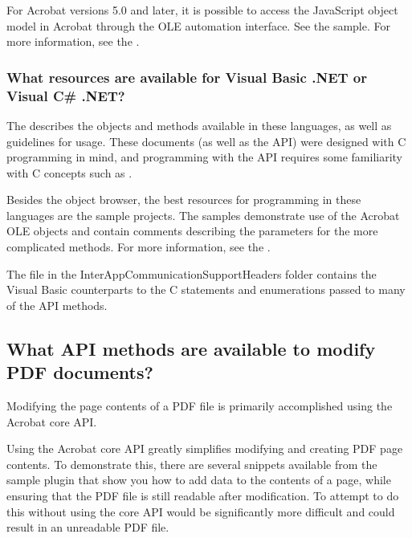 \documentclass[letterpaper,12pt,english,openany,oneside]{sphinxmanual}
\begin{document}
For Acrobat versions 5.0 and later, it is possible to access the JavaScript object model in Acrobat through the OLE automation  interface. See the  sample. For more information, see the  .


\subsubsection{What resources are available for Visual Basic .NET or Visual C\# .NET?}
\label{\detokenize{apxDevFAQ:what-resources-are-available-for-visual-basic-net-or-visual-c-net}}
The  describes the objects and methods available in these languages, as well as guidelines for usage. These documents (as well as the API) were designed with C programming in mind, and programming with the API requires some familiarity with C concepts such as  .

Besides the object browser, the best resources for programming in these languages are the sample projects. The samples demonstrate use of the Acrobat OLE objects and contain comments describing the parameters for the more complicated methods. For more information, see the  .

The  file in the InterAppCommunicationSupportHeaders folder contains the Visual Basic counterparts to the C  statements and enumerations passed to many of the API methods.


\subsection{What API methods are available to modify PDF documents?}
\label{\detokenize{apxDevFAQ:what-api-methods-are-available-to-modify-pdf-documents}}
Modifying the page contents of a PDF file is primarily accomplished using the Acrobat core API.

Using the Acrobat core API greatly simplifies modifying and creating PDF page contents. To demonstrate this, there are several snippets available from the  sample plug\sphinxhyphen{}in that show you how to add data to the contents of a page, while ensuring that the PDF file is still readable after modification. To attempt to do this without using the core API would be significantly more difficult and could result in an unreadable PDF file.
\end{document}
